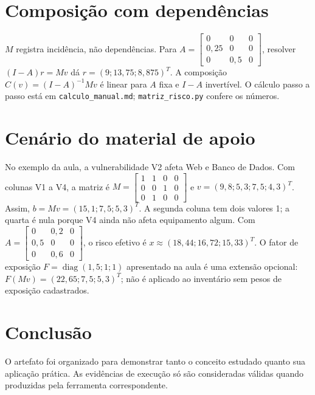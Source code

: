 \documentclass[12pt]{article}
\begin{document}
\section*{Composição com dependências}
$M$ registra incidência, não dependências. Para $A=\left[\begin{smallmatrix}0&0&0\\0,25&0&0\\0&0,5&0\end{smallmatrix}\right]$, resolver $(I-A)r=Mv$ dá $r=(9;13,75;8,875)^T$. A composição $C(v)=(I-A)^{-1}Mv$ é linear para $A$ fixa e $I-A$ invertível. O cálculo passo a passo está em \texttt{calculo\_manual.md}; \texttt{matriz\_risco.py} confere os números.
\section*{Cenário do material de apoio}
No exemplo da aula, a vulnerabilidade V2 afeta Web e Banco de Dados. Com colunas V1 a V4, a matriz é $M=\left[\begin{smallmatrix}1&1&0&0\\0&0&1&0\\0&1&0&0\end{smallmatrix}\right]$ e $v=(9,8;5,3;7,5;4,3)^T$. Assim, $b=Mv=(15,1;7,5;5,3)^T$. A segunda coluna tem dois valores 1; a quarta é nula porque V4 ainda não afeta equipamento algum. Com $A=\left[\begin{smallmatrix}0&0,2&0\\0,5&0&0\\0&0,6&0\end{smallmatrix}\right]$, o risco efetivo é $x\approx(18,44;16,72;15,33)^T$. O fator de exposição $F=\operatorname{diag}(1,5;1;1)$ apresentado na aula é uma extensão opcional: $F(Mv)=(22,65;7,5;5,3)^T$; não é aplicado ao inventário sem pesos de exposição cadastrados.
\section*{Conclusão}
O artefato foi organizado para demonstrar tanto o conceito estudado quanto sua aplicação prática. As evidências de execução só são consideradas válidas quando produzidas pela ferramenta correspondente.
\end{document}
